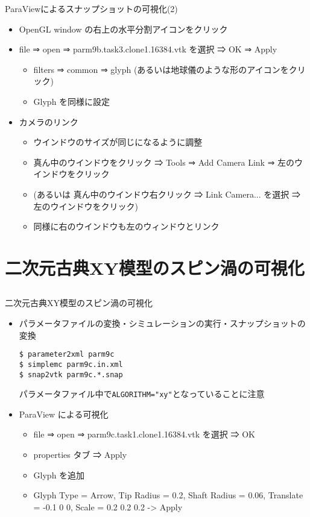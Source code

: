 \begin{frame}[t,fragile]{ParaViewによるスナップショットの可視化(2)}
  \begin{itemize}
  \item OpenGL window の右上の水平分割アイコンをクリック
  \item file ⇒ open ⇒ parm9b.task3.clone1.16384.vtk を選択 ⇒ OK ⇒ Apply
    \begin{itemize}
      \item filters ⇒ common ⇒ glyph (あるいは地球儀のような形のアイコンをクリック)
      \item Glyph を同様に設定
    \end{itemize}
  \item カメラのリンク
    \begin{itemize}
    \item ウインドウのサイズが同じになるように調整
    \item 真ん中のウインドウをクリック ⇒ Tools ⇒ Add Camera Link ⇒ 左のウインドウをクリック
    \item (あるいは 真ん中のウインドウ右クリック ⇒ Link Camera... を選択 ⇒ 左のウインドウをクリック)
    \item 同様に右のウインドウも左のウィンドウとリンク
    \end{itemize}
  \end{itemize}
\end{frame}

\section{二次元古典XY模型のスピン渦の可視化}
\subsection*{\redb\whiteb\greenm}

\begin{frame}[t,fragile]{二次元古典XY模型のスピン渦の可視化}
  \begin{itemize}
  \item パラメータファイルの変換・シミュレーションの実行・スナップショットの変換
\begin{lstlisting}
$ parameter2xml parm9c
$ simplemc parm9c.in.xml
$ snap2vtk parm9c.*.snap
\end{lstlisting}
パラメータファイル中で\verb+ALGORITHM="xy"+となっていることに注意
  \item ParaView による可視化
    \begin{itemize}
      \item file ⇒ open ⇒ parm9c.task1.clone1.16384.vtk を選択 ⇒ OK
      \item properties タブ ⇒ Apply
      \item Glyph を追加
      \item Glyph Type = Arrow, Tip Radius = 0.2, Shaft Radius = 0.06, Translate = -0.1 0 0, Scale = 0.2 0.2 0.2 -> Apply
    \end{itemize}
  \end{itemize}
\end{frame}

